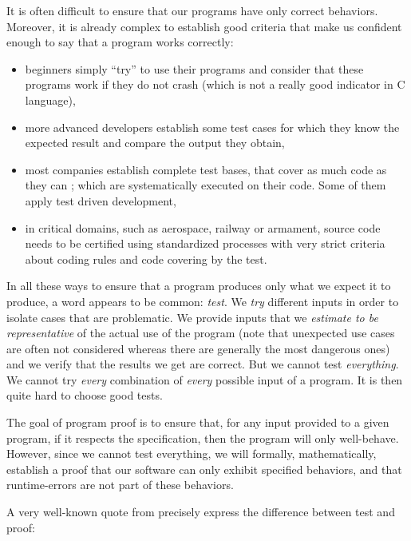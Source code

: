 

It is often difficult to ensure that our programs have only correct
behaviors. Moreover, it is already complex to establish good criteria
that make us confident enough to say that a program works correctly:



\begin{itemize}
\item
  beginners simply ``try'' to use their programs and consider that
  these programs work if they do not crash (which is not a really good
  indicator in C language),
\item
  more advanced developers establish some test cases for which they know
  the expected result and compare the output they obtain,
\item
  most companies establish complete test bases, that cover as much
  code as they can ; which are systematically executed on their code.
  Some of them apply test driven development,
\item
  in critical domains, such as aerospace, railway or armament, source
  code needs to be certified using standardized processes with very
  strict criteria about coding rules and code covering by the test.
\end{itemize}

In all these ways to ensure that a program produces only what we expect
it to produce, a word appears to be common: \emph{test}. We \emph{try}
different inputs in order to isolate cases that are problematic. We
provide inputs that we \emph{estimate to be representative} of the
actual use of the program (note that unexpected use cases are often not
considered whereas there are generally the most dangerous ones) and we
verify that the results we get are correct. But we cannot test
\emph{everything}. We cannot try \emph{every} combination of
\emph{every} possible input of a program. It is then quite hard to
choose good tests.


The goal of program proof is to ensure that, for any input provided to a
given program, if it respects the specification, then the program will
only well-behave. However, since we cannot test everything, we will
formally, mathematically, establish a proof that our software can only
exhibit specified behaviors, and that runtime-errors are not part of
these behaviors.



A very well-known quote from 
precisely express the difference between test and proof:



